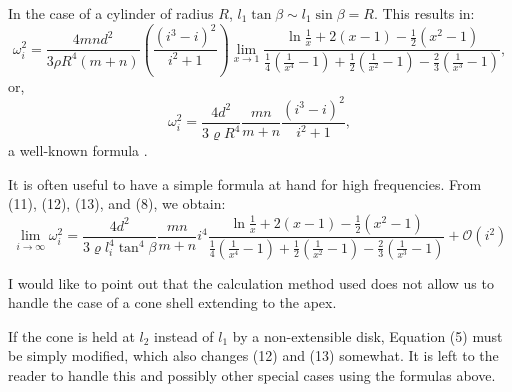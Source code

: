 \documentclass{amsart}
\begin{document}
In the case of a cylinder of radius \(R\), \(l_1 \tan \beta \sim l_1 \sin
\beta=R\).  This results in:
\begin{equation}
\omega_i^2=\frac{4 m n d^2}{3 \rho R^4(m+n)}
\left(\frac{\left(i^3-i\right)^2}{i^2+1}\right) \lim_{x \rightarrow 1} \frac{\ln \frac{1}{x}+2(x-1)-\frac{1}{2}\left(x^2-1\right)}{\frac{1}{4}\left(\frac{1}{x^4}-1\right)+\frac{1}{2}\left(\frac{1}{x^2}-1\right)-\frac{2}{3}\left(\frac{1}{x^3}-1\right)},
\end{equation}
or,
\[
\omega_i^2=\frac{4 d^2}{3 \varrho R^4} \frac{m n}{m+n} \frac{\left(i^3-i\right)^2}{i^2+1},
\]
a well-known formula \autocite[p 417 Eq 18]{Rayleigh1887}.

It is often useful to have a simple formula at hand for high frequencies. From
(11), (12), (13), and (8), we obtain:
\[
\lim_{i \rightarrow \infty} \omega_i^2=\frac{4 d^2}{3 \varrho l_i^4 \tan^4 \beta} \frac{m n}{m+n}
i^4 \frac{\ln \frac{1}{x}+2(x-1)-\frac{1}{2}\left(x^2-1\right)}{\frac{1}{4}\left(\frac{1}{x^4}-1\right)+\frac{1}{2}\left(\frac{1}{x^2}-1\right)-\frac{2}{3}\left(\frac{1}{x^3}-1\right)}
+ \mathcal{O}(i^2)
\]

I would like to point out that the calculation method used does not allow us to
handle the case of a cone shell extending to the apex.

If the cone is held at \(l_2\) instead of \(l_1\) by a non-extensible disk,
Equation (5) must be simply modified, which also changes (12) and (13)
somewhat. It is left to the reader to handle this and possibly other special
cases using the formulas above.

\printbibliography[heading=bibintoc,title={References}]
\end{document}

